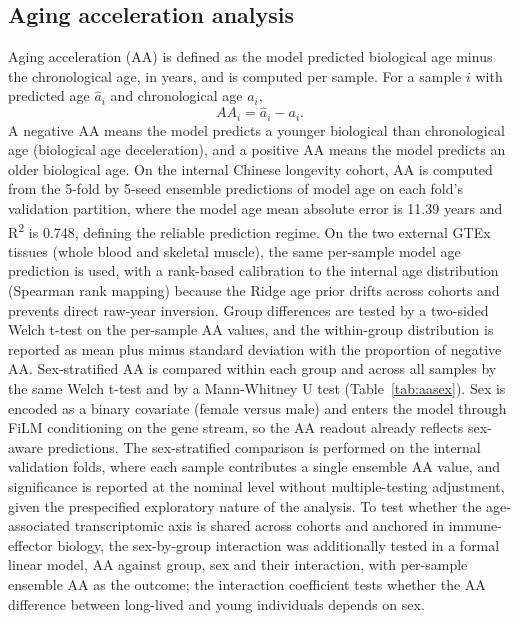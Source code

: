 \documentclass[unnumsec,webpdf,contemporary,large]{oup-authoring-template}
\begin{document}
\subsection{Aging acceleration analysis}\label{sec:aa-method}
Aging acceleration (AA) is defined as the model predicted biological age minus the chronological age, in years, and is computed per sample. For a sample $i$ with predicted age $\hat{a}_i$ and chronological age $a_i$,
\begin{equation}
AA_i = \hat{a}_i - a_i.
\label{eq:aa}
\end{equation} A negative AA means the model predicts a younger biological than chronological age (biological age deceleration), and a positive AA means the model predicts an older biological age. On the internal Chinese longevity cohort, AA is computed from the 5-fold by 5-seed ensemble predictions of model age on each fold's validation partition, where the model age mean absolute error is 11.39 years and R\textsuperscript{2} is 0.748, defining the reliable prediction regime. On the two external GTEx tissues (whole blood and skeletal muscle), the same per-sample model age prediction is used, with a rank-based calibration to the internal age distribution (Spearman rank mapping) because the Ridge age prior drifts across cohorts and prevents direct raw-year inversion. Group differences are tested by a two-sided Welch t-test on the per-sample AA values, and the within-group distribution is reported as mean plus minus standard deviation with the proportion of negative AA. Sex-stratified AA is compared within each group and across all samples by the same Welch t-test and by a Mann-Whitney U test (Table~\ref{tab:aasex}). Sex is encoded as a binary covariate (female versus male) and enters the model through FiLM conditioning on the gene stream, so the AA readout already reflects sex-aware predictions. The sex-stratified comparison is performed on the internal validation folds, where each sample contributes a single ensemble AA value, and significance is reported at the nominal level without multiple-testing adjustment, given the prespecified exploratory nature of the analysis. To test whether the age-associated transcriptomic axis is shared across cohorts and anchored in immune-effector biology, the sex-by-group interaction was additionally tested in a formal linear model, AA against group, sex and their interaction, with per-sample ensemble AA as the outcome; the interaction coefficient tests whether the AA difference between long-lived and young individuals depends on sex.
\end{document}
